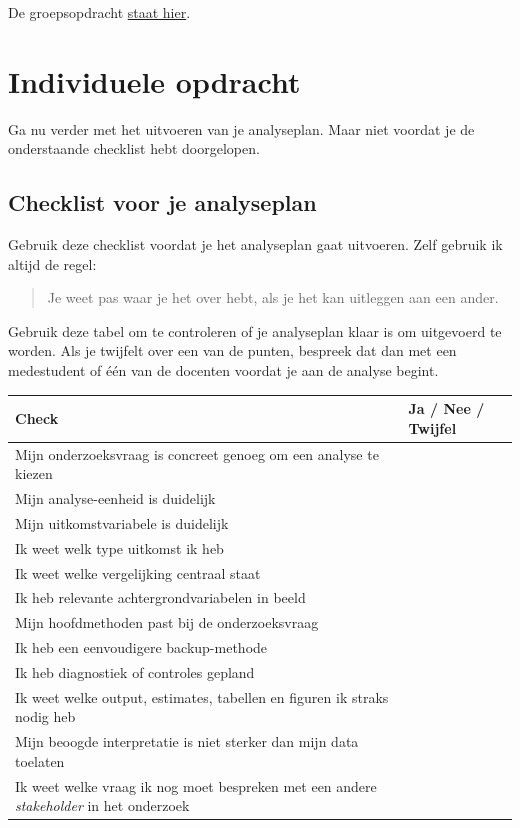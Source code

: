 \documentclass[
  letterpaper,
  DIV=11,
  numbers=noendperiod]{scrreprt}
\newcounter{none} %
\begin{document}
De groepsopdracht \href{opdracht/Groepsopdracht5.html}{staat hier}.

\section{Individuele opdracht}\label{individuele-opdracht-4}

Ga nu verder met het uitvoeren van je analyseplan. Maar niet voordat je
de onderstaande checklist hebt doorgelopen.

\subsection{Checklist voor je
analyseplan}\label{checklist-voor-je-analyseplan}

Gebruik deze checklist voordat je het analyseplan gaat uitvoeren. Zelf
gebruik ik altijd de regel:

\begin{quote}
Je weet pas waar je het over hebt, als je het kan uitleggen aan een
ander.
\end{quote}

Gebruik deze tabel om te controleren of je analyseplan klaar is om
uitgevoerd te worden. Als je twijfelt over een van de punten, bespreek
dat dan met een medestudent of één van de docenten voordat je aan de
analyse begint.

{\def\LTcaptype{none} %
\begin{longtable}[]{@{}
  >{\raggedright\arraybackslash}p{}
  >{\raggedright\arraybackslash}p{}@{}}
\toprule\noalign{}
\begin{minipage}[b]{\linewidth}\raggedright
Check
\end{minipage} & \begin{minipage}[b]{\linewidth}\raggedright
Ja / Nee / Twijfel
\end{minipage} \\
\midrule\noalign{}
\endhead
\bottomrule\noalign{}
\endlastfoot
Mijn onderzoeksvraag is concreet genoeg om een analyse te kiezen & \\
Mijn analyse-eenheid is duidelijk & \\
Mijn uitkomstvariabele is duidelijk & \\
Ik weet welk type uitkomst ik heb & \\
Ik weet welke vergelijking centraal staat & \\
Ik heb relevante achtergrondvariabelen in beeld & \\
Mijn hoofdmethoden past bij de onderzoeksvraag & \\
Ik heb een eenvoudigere backup-methode & \\
Ik heb diagnostiek of controles gepland & \\
Ik weet welke output, estimates, tabellen en figuren ik straks nodig heb
& \\
Mijn beoogde interpretatie is niet sterker dan mijn data toelaten & \\
Ik weet welke vraag ik nog moet bespreken met een andere
\emph{stakeholder} in het onderzoek & \\
\end{longtable}
}
\end{document}
